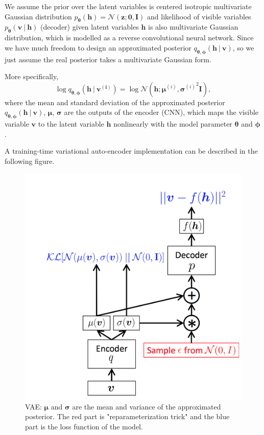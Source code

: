 \documentclass[conference]{IEEEtran}
\begin{document}
We assume the prior over the latent variables is centered isotropic multivariate Gaussian distribution $p_{\boldsymbol{\theta}}(\boldsymbol{h})=\mathcal{N}(\boldsymbol{z};\boldsymbol{0}, \mathbf{I})$ and likelihood of visible variables $p_{\boldsymbol{\theta}}(\boldsymbol{v}\ |\ \boldsymbol{h})$ (decoder) given latent variables $\boldsymbol{h}$ is also multivariate Gaussian distribution, which is modelled as a reverse convolutional neural network. Since we have much freedom to design an approximated posterior $q_{\boldsymbol{\theta}, \boldsymbol{\phi}}(\boldsymbol{h}\ |\ \boldsymbol{v})$, so we just assume the real posterior takes a multivariate Gaussian form.

More specifically,
\begin{equation}
	\log q_{\boldsymbol{\theta}, \boldsymbol{\phi}}(\boldsymbol{h}\ |\ \boldsymbol{v^{(i)}})=\log \mathcal{N}(\boldsymbol{h};\boldsymbol{\mu}^{(i)}, {\boldsymbol{\sigma}^{(i)}}^{2}\mathbf{I}),
\end{equation}
where the mean and standard deviation of the approximated posterior $q_{\boldsymbol{\theta}, \boldsymbol{\phi}}(\boldsymbol{h}\ |\ \boldsymbol{v})$, $\boldsymbol{\mu}$, $\boldsymbol{\sigma}$ are the outputs of the encoder (CNN), which maps the visible variable $\boldsymbol{v}$ to the latent variable $\boldsymbol{h}$ nonlinearly with the model parameter $\boldsymbol{\theta}$ and $\boldsymbol{\phi}$.

A training-time variational auto-encoder implementation can be described in the following figure.
\begin{figure}[ht]
  \centering
  \includegraphics[scale=0.4]{picture3.jpg}
     \caption{VAE: $\boldsymbol{\mu}$ and $\boldsymbol{\sigma}$ are the mean and variance of the approximated posterior. The red part is "reparameterization trick" and the blue part is the loss function of the model.\cite{doersch2016tutorial}}\label{pic_3}
\end{figure}
\end{document}
